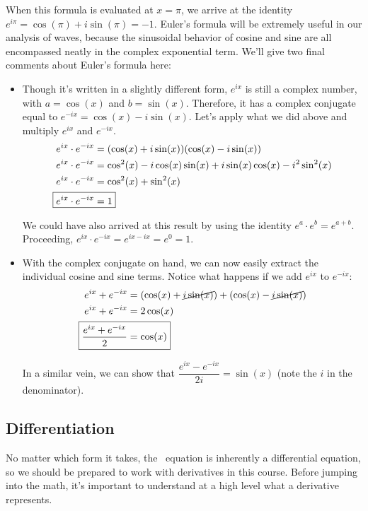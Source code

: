 When this formula is evaluated at $x=\pi$, we arrive at the identity $e^{i\pi} = \cos(\pi) + i\sin(\pi) = -1$. Euler's formula will be extremely useful in our analysis of waves, because the sinusoidal behavior of cosine and sine are all encompassed neatly in the complex exponential term. 
We'll give two final comments about Euler's formula here:
\begin{itemize}
	\item Though it's written in a slightly different form, $e^{ix}$ is still a complex number, with $a = \cos(x)$ and $b = \sin(x)$. Therefore, it has a complex conjugate equal to $e^{-ix}=\cos(x) -i\sin(x)$. Let's apply what we did above and multiply $e^{ix}$ and $e^{-ix}$.
	\begin{align*}
	e^{ix} \cdot e^{-ix} &= (\cos(x) + i\sin(x))(\cos(x)-i\sin(x)) \\
	e^{ix} \cdot e^{-ix} &= \cos^2(x) -i\cos(x)\sin(x) + i\sin(x)\cos(x) -i^2\sin^2(x) \\
	e^{ix} \cdot e^{-ix} &= \cos^2(x) + \sin^2(x) \\
	\Aboxed{e^{ix} \cdot e^{-ix} &= 1} 
	\end{align*}
	
	We could have also arrived at this result by using the identity $e^a \cdot e^b = e^{a+b}$. Proceeding, $e^{ix} \cdot e^{-ix} = e^{ix - ix} = e^0 = 1$.
	
	\item With the complex conjugate on hand, we can now easily extract the individual cosine and sine terms. Notice what happens if we add $e^{ix}$ to $e^{-ix}$:
	\begin{align*}
	e^{ix} + e^{-ix} &= (\cos(x) + \cancel{i\sin(x)}) + (\cos(x) - \cancel{i\sin(x)}) \\
	e^{ix} + e^{-ix} &= 2\cos(x) \\
	\Aboxed{ \dfrac{e^{ix} + e^{-ix}}{2}&= \cos(x) }
	\end{align*}
	
	In a similar vein, we can show that $\boxed{\dfrac{e^{ix} - e^{-ix}}{2i} = \sin(x)}$ (note the $i$ in the denominator).
	
\end{itemize}


\subsection{Differentiation} \label{sec:diff}
No matter which form it takes, the \Sch\ equation is inherently a differential equation, so we should be prepared to work with derivatives in this course. Before jumping into the math, it's important to understand at a high level what a derivative represents.

